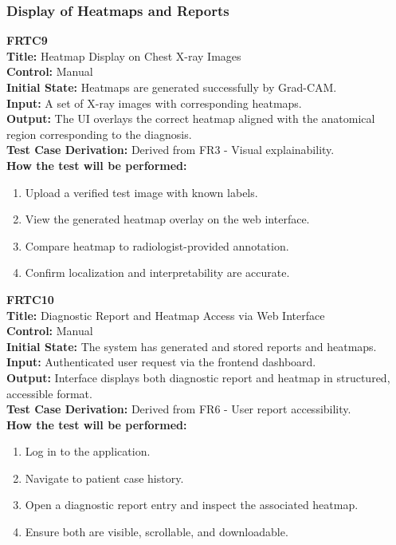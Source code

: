 \documentclass[12pt, titlepage]{article}
\begin{document}
\vspace{1em}

\subsubsection{Display of Heatmaps and Reports}

\textbf{FRTC9}\\
\textbf{Title:} Heatmap Display on Chest X-ray Images\\
\textbf{Control:} Manual\\
\textbf{Initial State:} Heatmaps are generated successfully by Grad-CAM.\\
\textbf{Input:} A set of X-ray images with corresponding heatmaps.\\
\textbf{Output:} The UI overlays the correct heatmap aligned with the anatomical region corresponding to the diagnosis.\\
\textbf{Test Case Derivation:} Derived from FR3 - Visual explainability.\\
\textbf{How the test will be performed:}
\begin{enumerate}
  \item Upload a verified test image with known labels.
  \item View the generated heatmap overlay on the web interface.
  \item Compare heatmap to radiologist-provided annotation.
  \item Confirm localization and interpretability are accurate.
\end{enumerate}

\vspace{1em}

\textbf{FRTC10}\\
\textbf{Title:} Diagnostic Report and Heatmap Access via Web Interface\\
\textbf{Control:} Manual\\
\textbf{Initial State:} The system has generated and stored reports and heatmaps.\\
\textbf{Input:} Authenticated user request via the frontend dashboard.\\
\textbf{Output:} Interface displays both diagnostic report and heatmap in structured, accessible format.\\
\textbf{Test Case Derivation:} Derived from FR6 - User report accessibility.\\
\textbf{How the test will be performed:}
\begin{enumerate}
  \item Log in to the application.
  \item Navigate to patient case history.
  \item Open a diagnostic report entry and inspect the associated heatmap.
  \item Ensure both are visible, scrollable, and downloadable.
\end{enumerate}
\end{document}
